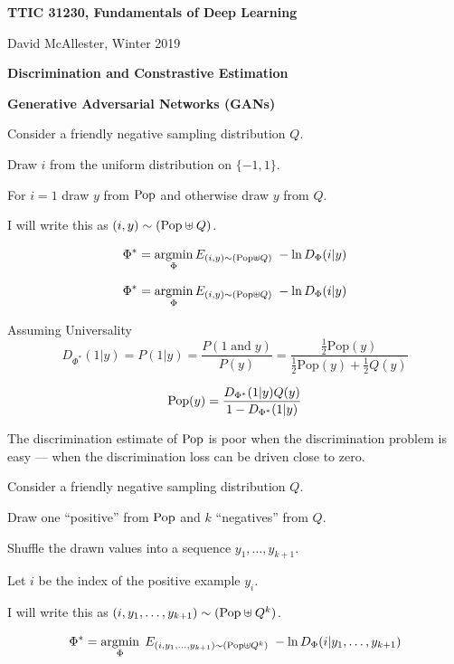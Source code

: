 





{\Huge

  \centerline{\bf TTIC 31230, Fundamentals of Deep Learning}
  \bigskip
  \centerline{David McAllester, Winter 2019}
  \vfill
  \centerline{\bf Discrimination and Constrastive Estimation}
  \vfill
  \centerline{\bf Generative Adversarial Networks (GANs)}
  \vfill
\vfill
\vfill


Consider a friendly negative sampling distribution $Q$.

\vfill
Draw $i$ from the uniform distribution on $\{-1,1\}$.

\vfill
For $i = 1$ draw $y$ from $\mathrm{Pop}$ and otherwise draw $y$ from $Q$.

\vfill
I will write this as {\color{red} $(i,y) \sim (\mathrm{Pop} \uplus Q)$}.

\vfill
{\color{red} $$\Phi^* = \operatorname*{argmin}_\Phi E_{(i,y) \sim (\mathrm{Pop} \uplus Q)}\;-\ln D_\Phi(i|y)$$}


{\color{red} $$\Phi^* = \operatorname*{argmin}_\Phi E_{(i,y) \sim (\mathrm{Pop} \uplus Q)}\;-\ln D_\Phi(i|y)$$}

Assuming Universality
$$D_{\Phi^*}(1|y) = P(1|y) = \frac{P(1\;\mathrm{and}\; y)}{P(y)} = \frac{\frac{1}{2}\mathrm{Pop}(y)}{\frac{1}{2}\mathrm{Pop}(y) + \frac{1}{2}Q(y)}$$

\vfill
\vfill
{\color{red} $$ \mathrm{Pop}(y) = \frac{D_{\Phi^*}(1|y)Q(y)}{1-D_{\Phi^*}(1|y)}$$}


The discrimination estimate of $\mathrm{Pop}$ is poor when the discrimination problem is easy --- when the discrimination loss can be driven close to zero.


Consider a friendly negative sampling distribution $Q$.

\vfill
Draw one ``positive'' from $\mathrm{Pop}$ and $k$ ``negatives'' from $Q$.

\vfill
Shuffle the drawn values into a sequence $y_1,\ldots,y_{k+1}$.

\vfill
Let $i$ be the index of the positive example $y_i$.

\vfill
I will write this as $(i,y_1,\ldots,y_{k+1}) \sim (\mathrm{Pop} \uplus Q^k)$.

{\color{red} $$\Phi^* = \operatorname*{argmin}_\Phi\; E_{(i,y_1,\ldots,y_{k+1})\sim (\mathrm{Pop}\uplus Q^k)} \;- \ln D_\Phi(i|y_1,\ldots,y_{k+1})$$}

}
